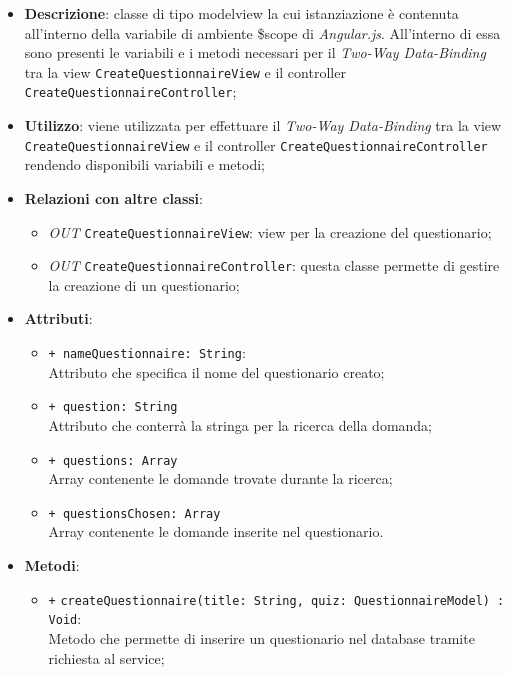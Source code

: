 	\begin{itemize}
		\item \textbf{Descrizione}: classe di tipo modelview la cui istanziazione è contenuta all'interno della variabile di ambiente \$scope di \textit{Angular.js}. All'interno di essa sono presenti le variabili e i metodi necessari per il \textit{Two-Way Data-Binding} tra la view \texttt{CreateQuestionnaireView} e il controller \texttt{CreateQuestionnaireController};
		\item \textbf{Utilizzo}: viene utilizzata per effettuare il \textit{Two-Way Data-Binding} tra la view \texttt{CreateQuestionnaireView} e il controller \texttt{CreateQuestionnaireController} rendendo disponibili variabili e metodi;
		\item \textbf{Relazioni con altre classi}: 
		\begin{itemize}
			\item \textit{OUT} \texttt{CreateQuestionnaireView}: view per la creazione del questionario; 
			\item \textit{OUT} \texttt{CreateQuestionnaireController}: questa classe permette di gestire la creazione di un questionario;
		\end{itemize}
		\item \textbf{Attributi}: 
		\begin{itemize}
			\item \texttt{+ nameQuestionnaire: String}: \\ Attributo che specifica il nome del questionario creato;
			\item \texttt{+ question: String} \\ Attributo che conterrà la stringa per la ricerca della domanda;
			\item \texttt{+ questions: Array} \\ Array contenente le domande trovate durante la ricerca;
			\item \texttt{+ questionsChosen: Array} \\ Array contenente le domande inserite nel questionario.
		\end{itemize}
		\item \textbf{Metodi}: 
		\begin{itemize}
			\item \texttt{+} \texttt{createQuestionnaire(title: String, quiz: QuestionnaireModel) : Void}: \\Metodo che permette di inserire un questionario nel database tramite richiesta al service; \\

\end{itemize}
\end{itemize}
